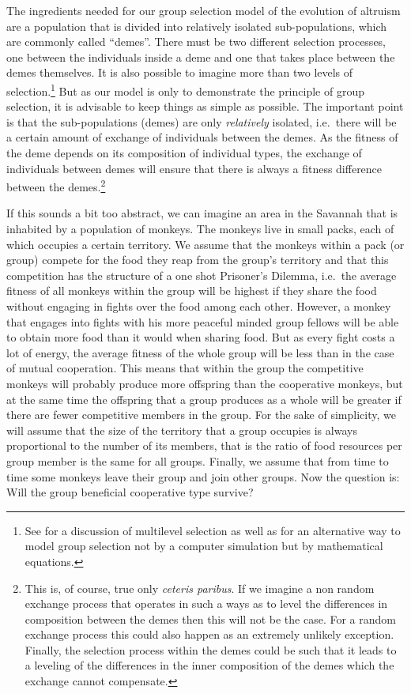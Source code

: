 The ingredients needed for our group selection model of the evolution of
altruism are a population that is divided into relatively isolated
sub-populations, which are commonly called ``demes''. There must be two
different selection processes, one between the individuals inside a deme and
one that takes place between the demes themselves. It is also possible to
imagine more than two levels of selection.\footnote{See
\cite[]{sober-wilson:1998} for a discussion of multilevel selection as well as
for an alternative way to model group selection not by a computer simulation
but by mathematical equations.} But as our model is only to
demonstrate the principle of group selection, it is advisable to keep things
as simple as possible. The important point is that the sub-populations (demes)
are only {\em relatively} isolated, i.e.\ there will be a certain amount of
exchange of individuals between the demes. As the fitness of the deme depends
on its composition of individual types, the exchange of individuals between
demes will ensure that there is always a fitness difference between the
demes.\footnote{This is, of course, true only {\em ceteris paribus}. If we
  imagine a non random exchange process that operates in such a ways as to
  level the differences in composition between the demes then this will not be
  the case.  For a random exchange process this could also happen as an
  extremely unlikely exception. Finally, the selection process within the
  demes could be such that it leads to a leveling of the differences in the
  inner composition of the demes which the exchange cannot compensate.}

If this sounds a bit too abstract, we can imagine an area in the Savannah that is
inhabited by a population of monkeys. The monkeys live in small packs, each
of which occupies a certain territory. We assume that the monkeys within a pack
(or group) compete for the food they reap from the group's territory and that
this competition has the structure of a one shot Prisoner's Dilemma, i.e.\ the
average fitness of all monkeys within the group will be highest if they share
the food without engaging in fights over the food among each other. However, a
monkey that engages into fights with his more peaceful minded group fellows
will be able to obtain more food than it would when sharing food. But as
every fight costs a lot of energy, the average fitness of the whole group will
be less than in the case of mutual cooperation.  This means that within the
group the competitive monkeys will probably produce more offspring than the
cooperative monkeys, but at the same time the offspring that a group produces
as a whole will be greater if there are fewer competitive members in the
group. For the sake of simplicity, we will assume that the size of the
territory that a group occupies is always proportional to the number of its
members, that is the ratio of food resources per group member is the same for
all groups. Finally, we assume that from time to time some monkeys leave their
group and join other groups. Now the question is: Will the group beneficial
cooperative type survive?

